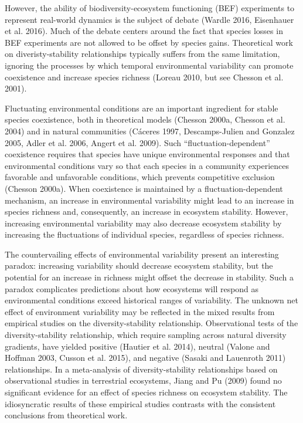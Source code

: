 \documentclass[12pt,]{article}
\begin{document}
However, the ability of biodiversity-ecosystem functioning (BEF)
experiments to represent real-world dynamics is the subject of debate
(Wardle 2016, Eisenhauer et al. 2016). Much of the debate centers around
the fact that species losses in BEF experiments are not allowed to be
offset by species gains. Theoretical work on diveristy-stability
relationships typically suffers from the same limitation, ignoring the
processes by which temporal environmental variability can promote
coexistence and increase species richness (Loreau 2010, but see Chesson
et al. 2001).

Fluctuating environmental conditions are an important ingredient for
stable species coexistence, both in theoretical models (Chesson 2000a,
Chesson et al. 2004) and in natural communities (C{á}ceres 1997,
Descamps-Julien and Gonzalez 2005, Adler et al. 2006, Angert et al.
2009). Such ``fluctuation-dependent'' coexistence requires that species
have unique environmental responses and that environmental conditions
vary so that each species in a community experiences favorable and
unfavorable conditions, which prevents competitive exclusion (Chesson
2000a). When coexistence is maintained by a fluctuation-dependent
mechanism, an increase in environmental variability might lead to an
increase in species richness and, consequently, an increase in ecosystem
stability. However, increasing environmental variability may also
decrease ecosystem stability by increasing the fluctuations of
individual species, regardless of species richness.

The countervailing effects of environmental variability present an
interesting paradox: increasing variability should decrease ecosystem
stability, but the potential for an increase in richness might offset
the decrease in stability. Such a paradox complicates predictions about
how ecosystems will respond as environmental conditions exceed
historical ranges of variability. The unknown net effect of environment
variability may be reflected in the mixed results from empirical studies
on the diversity-stability relationship. Observational tests of the
diversity-stability relationship, which require sampling across natural
diversity gradients, have yielded positive (Hautier et al. 2014),
neutral (Valone and Hoffman 2003, Cusson et al. 2015), and negative
(Sasaki and Lauenroth 2011) relationships. In a meta-analysis of
diversity-stability relationships based on observational studies in
terrestrial ecosystems, Jiang and Pu (2009) found no significant
evidence for an effect of species richness on ecosystem stability. The
idiosyncratic results of these empirical studies contrasts with the
consistent conclusions from theoretical work.
\end{document}
